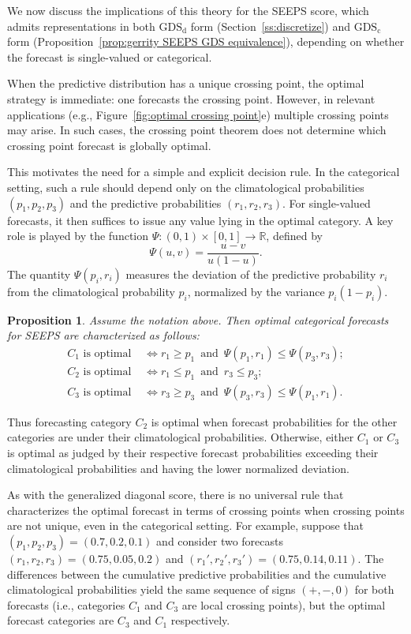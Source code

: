 \documentclass[10pt]{article} %
\theoremstyle{theorem}
\newtheorem{prop}{Proposition}
\theoremstyle{definition}
\newcommand{\RRR}{\mathbb{R}}
\newcommand{\GDSd}{\mathrm{GDS}_\mathrm{d}}
\newcommand{\GDSc}{\mathrm{GDS}_\mathrm{c}}
\begin{document}
We now discuss the implications of this theory for the SEEPS score, which admits representations in both $\GDSd$ form (Section~\ref{ss:discretize}) and $\GDSc$ form (Proposition~\ref{prop:gerrity SEEPS GDS equivalence}), depending on whether the forecast is single-valued or categorical.

When the predictive distribution has a unique crossing point, the optimal strategy is immediate: one forecasts the crossing point. However, in relevant applications (e.g., Figure~\ref{fig:optimal crossing point}e) multiple crossing points may arise. In such cases, the crossing point theorem does not determine which crossing point forecast is globally optimal.

This motivates the need for a simple and explicit decision rule. In the categorical setting, such a rule should depend only on the climatological probabilities $(p_1,p_2,p_3)$ and the predictive probabilities $(r_1,r_2,r_3)$. For single-valued forecasts, it then suffices to issue any value lying in the optimal category. A key role is played by the function $\Psi:(0,1)\times[0,1]\to\RRR$, defined by
\[
\Psi(u,v) = \frac{u-v}{u(1-u)}.
\]
The quantity $\Psi(p_i,r_i)$ measures the deviation of the predictive probability $r_i$ from the climatological probability $p_i$, normalized by the variance $p_i(1-p_i)$.

\begin{prop}\label{prop:optimal seeps}
Assume the notation above. Then optimal categorical forecasts for SEEPS are characterized as follows:
\begin{align}
C_1 \text{ is optimal } &\iff  r_1\geq p_1 \,\text{ and }\, \Psi(p_1,r_1)\leq \Psi(p_3,r_3); \\
C_2 \text{ is optimal } &\iff  r_1\leq p_1 \,\text{ and }\, r_3 \leq p_3; \\
C_3 \text{ is optimal } &\iff  r_3\geq p_3 \,\text{ and }\, \Psi(p_3,r_3)\leq \Psi(p_1,r_1).
\end{align}
\end{prop}

Thus forecasting category $C_2$ is optimal when forecast probabilities for the other categories are under their climatological probabilities. Otherwise, either $C_1$ or $C_3$ is optimal as judged by their respective forecast probabilities exceeding their climatological probabilities and having the lower normalized deviation. 

As with the generalized diagonal score, there is no universal rule that characterizes the optimal forecast in terms of crossing points when crossing points are not unique, even in the categorical setting. For example, suppose that $(p_1, p_2, p_3)=(0.7, 0.2, 0.1)$ and consider two forecasts $(r_1,r_2,r_3)=(0.75, 0.05, 0.2)$ and $(r_1',r_2',r_3')=(0.75, 0.14, 0.11)$. The differences between the cumulative predictive probabilities and the cumulative climatological probabilities yield the same sequence of signs $(+,-,0)$ for both forecasts (i.e., categories $C_1$ and $C_3$ are local crossing points), but the optimal forecast categories are $C_3$ and $C_1$ respectively.
\end{document}
